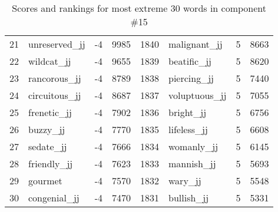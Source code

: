\begin{table}[tbp]
\begin{tabular}{| rlr@{.}l | rlr@{.}l |}
    21 & unreserved\_jj & -4 & 9985    &    1840 & malignant\_jj & 5 & 8663 \\
    22 & wildcat\_jj & -4 & 9655    &    1839 & beatific\_jj & 5 & 8620 \\
    23 & rancorous\_jj & -4 & 8789    &    1838 & piercing\_jj & 5 & 7440 \\
    24 & circuitous\_jj & -4 & 8687    &    1837 & voluptuous\_jj & 5 & 7055 \\
    25 & frenetic\_jj & -4 & 7902    &    1836 & bright\_jj & 5 & 6756 \\
    26 & buzzy\_jj & -4 & 7770    &    1835 & lifeless\_jj & 5 & 6608 \\
    27 & sedate\_jj & -4 & 7666    &    1834 & womanly\_jj & 5 & 6145 \\
    28 & friendly\_jj & -4 & 7623    &    1833 & mannish\_jj & 5 & 5693 \\
    29 & gourmet & -4 & 7570    &    1832 & wary\_jj & 5 & 5548 \\
    30 & congenial\_jj & -4 & 7470    &    1831 & bullish\_jj & 5 & 5331 \\
    \hline
    \end{tabular}
    \caption{Scores and rankings for most extreme 30 words in component \#15} 
\end{table}
\clearpage
